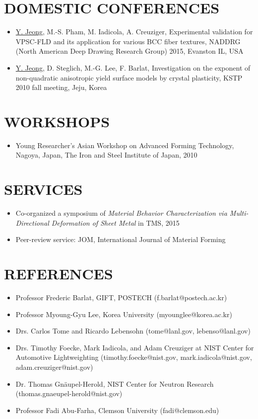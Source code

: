 \documentclass{res}
\begin{document}
\begin{resume}
  \section{DOMESTIC CONFERENCES}
  \begin{itemize}
  \item \underline{Y. Jeong}, M.-S. Pham, M. Iadicola, A. Creuziger, Experimental validation for VPSC-FLD and its application for various BCC fiber textures, NADDRG (North American Deep Drawing Research Group) 2015, Evanston IL, USA
  \item \underline{Y. Jeong}, D. Steglich, M.-G. Lee, F. Barlat, Investigation on the exponent of non-quadratic anisotropic yield surface models by crystal plasticity, KSTP 2010 fall meeting, Jeju, Korea
  \end{itemize}

  \section{WORKSHOPS}
  \begin{itemize}
  \item Young Researcher's Asian Workshop on Advanced Forming Technology, Nagoya, Japan, The Iron and Steel Institute of Japan, 2010
  \end{itemize}

  \section{SERVICES}
  \begin{itemize}
  \item Co-organized a symposium of {\it Material Behavior Characterization via Multi-Directional Deformation of Sheet Metal} in TMS, 2015
  \item Peer-review service: JOM, International Journal of Material Forming
  \end{itemize}

  \section{REFERENCES}
  \begin{itemize}
  \item Professor Frederic Barlat, GIFT, POSTECH (f.barlat@postech.ac.kr)
  \item Professor Myoung-Gyu Lee, Korea University (myounglee@korea.ac.kr)
  \item Drs. Carlos Tome and Ricardo Lebensohn (tome@lanl.gov, lebenso@lanl.gov)
  \item Drs. Timothy Foecke, Mark Iadicola, and Adam Creuziger at NIST Center for Automotive Lightweighting (timothy.foecke@nist.gov, mark.iadicola@nist.gov, adam.creuziger@nist.gov)
  \item Dr. Thomas Gn\"aupel-Herold, NIST Center for Neutron Research (thomas.gnaeupel-herold@nist.gov)
  \item Professor Fadi Abu-Farha, Clemson University (fadi@clemson.edu)
  \end{itemize}

\end{resume}
\end{document}
